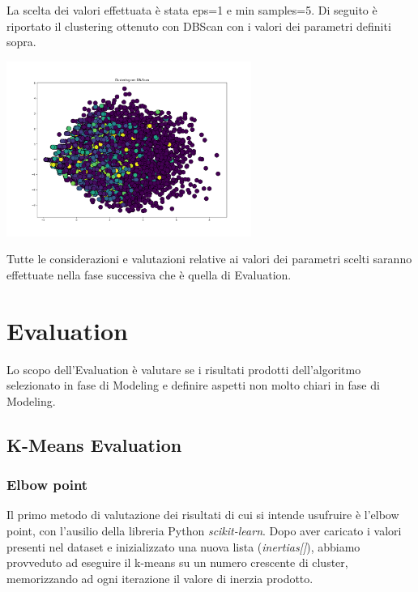\documentclass[a4paper, 10pt]{report}
\begin{document}
                La scelta dei valori effettuata è stata eps=1 e min samples=5. Di seguito è riportato il clustering ottenuto con
                DBScan con i valori dei parametri definiti sopra.

                \begin{center}
                    \includegraphics[width=8cm]{modelling/DBScan.png}\\
                \end{center}

                Tutte le considerazioni e valutazioni relative ai valori dei parametri scelti saranno effettuate nella fase successiva
                che è quella di Evaluation.


    \chapter{Evaluation}\label{ch:evaluation}

        Lo scopo dell'Evaluation è valutare se i risultati prodotti dell'algoritmo selezionato in fase di Modeling e definire aspetti
        non molto chiari in fase di Modeling.

        \section{K-Means Evaluation}\label{sec:k-means-evaluation}
            \subsection{Elbow point}
                Il primo metodo di valutazione dei risultati di cui si intende usufruire è l'elbow point, con l'ausilio della
                libreria Python \textit{scikit-learn}. Dopo aver caricato i valori presenti nel dataset e inizializzato una nuova
                lista (\textit{inertias[]}), abbiamo provveduto ad eseguire il k-means su un numero crescente di cluster, memorizzando
                ad ogni iterazione il valore di inerzia prodotto.
\end{document}
